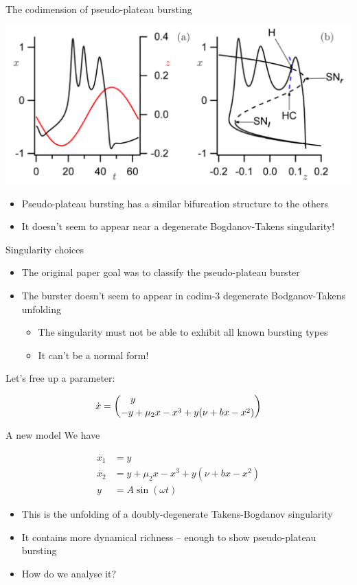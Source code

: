 \documentclass[presentation]{beamer}
\begin{document}
\begin{frame}[label={sec:org05672fa}]{The codimension of pseudo-plateau bursting}
\begin{center}
\includegraphics[width=.8\textwidth]{./psb.png}
\end{center}

\begin{itemize}
\item Pseudo-plateau bursting has a similar bifurcation structure to the others
\item It doesn't seem to appear near a degenerate Bogdanov-Takens singularity!
\end{itemize}
\end{frame}

\begin{frame}[label={sec:orgafefff9}]{Singularity choices}
\begin{itemize}
\item The original paper goal was to classify the pseudo-plateau burster
\item The burster doesn't seem to appear in codim-3 degenerate Bodganov-Takens unfolding
\begin{itemize}
\item The singularity must not be able to exhibit all known bursting types
\item It can't be a normal form!
\end{itemize}
\end{itemize}

\vfill 

Let's free up a parameter:

\[\dot{x} = \binom{\quad y \hfill}{-y + \mu_2 x - x^3 + y(\nu + bx - x^2)}\]
\end{frame}

\begin{frame}[label={sec:orgf4c4260}]{A new model}
We have

\begin{align}
\dot{x_1} &= y \nonumber \\
\dot{x_2} &= y + \mu_2 x - x^3 + y(\nu + bx - x^2) \nonumber \\
 y &= A \sin(\omega t)  \nonumber
\end{align}	

\begin{itemize}
\item This is the unfolding of a doubly-degenerate Takens-Bogdanov singularity
\item It contains more dynamical richness -- enough to show pseudo-plateau bursting
\item How do we analyse it?
\end{itemize}
\end{frame}
\end{document}
